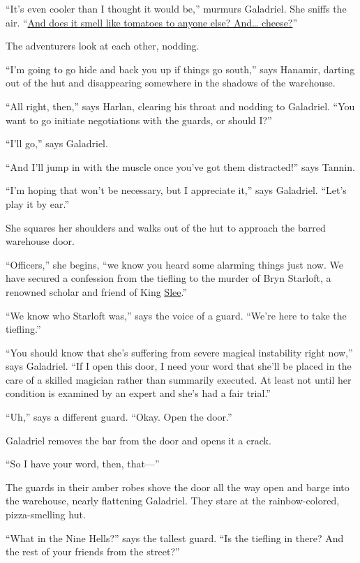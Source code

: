 \documentclass[smalldemyvopaper,11pt,twoside,onecolumn,openright,extrafontsizes]{memoir}
\begin{document}
``It's even cooler than I thought it would be,'' murmurs Galadriel. She
sniffs the air. ``\href{https://www.youtube.com/watch?v=7HpCJov3Uj0}{And
does it smell like tomatoes to anyone else? And\ldots{} cheese?}''

The adventurers look at each other, nodding.

``I'm going to go hide and back you up if things go south,'' says
Hanamir, darting out of the hut and disappearing somewhere in the
shadows of the warehouse.

``All right, then,'' says Harlan, clearing his throat and nodding to
Galadriel. ``You want to go initiate negotiations with the guards, or
should I?''

``I'll go,'' says Galadriel.

``And I'll jump in with the muscle once you've got them distracted!''
says Tannin.

``I'm hoping that won't be necessary, but I appreciate it,'' says
Galadriel. ``Let's play it by ear.''

She squares her shoulders and walks out of the hut to approach the
barred warehouse door.

``Officers,'' she begins, ``we know you heard some alarming things just
now. We have secured a confession from the tiefling to the murder of
Bryn Starloft, a renowned scholar and friend of King
\href{/characters/slee/}{Slee}.''

``We know who Starloft was,'' says the voice of a guard. ``We're here to
take the tiefling.''

``You should know that she's suffering from severe magical instability
right now,'' says Galadriel. ``If I open this door, I need your word
that she'll be placed in the care of a skilled magician rather than
summarily executed. At least not until her condition is examined by an
expert and she's had a fair trial.''

``Uh,'' says a different guard. ``Okay. Open the door.''

Galadriel removes the bar from the door and opens it a crack.

``So I have your word, then, that---''

The guards in their amber robes shove the door all the way open and
barge into the warehouse, nearly flattening Galadriel. They stare at the
rainbow-colored, pizza-smelling hut.

``What in the Nine Hells?'' says the tallest guard. ``Is the tiefling in
there? And the rest of your friends from the street?''
\end{document}
